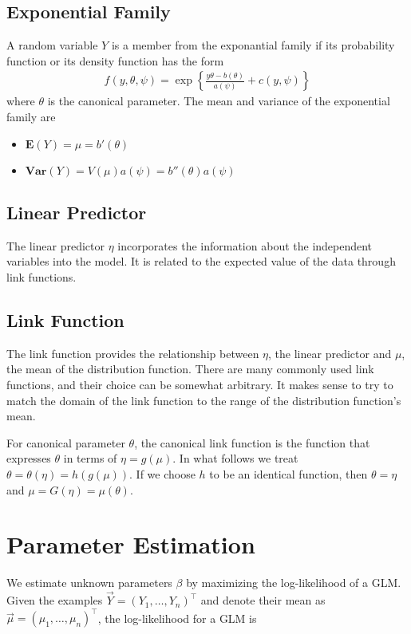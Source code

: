 \subsection{Exponential Family}
A random variable $Y$ is a member from the exponantial family if its probability function or its density function has the form
\begin{align*}
f(y,\theta, \psi) = \exp \left\{ \frac{y\theta - b(\theta)}{a(\psi)} + c(y, \psi)\right\}
\end{align*}
where $\theta$ is the canonical parameter.
The mean and variance of the exponential family are
\begin{itemize}
\item $\mathbf{E}(Y) = \mu = b'(\theta)$
\item $\mathbf{Var}(Y) = V(\mu)a(\psi) = b''(\theta)a(\psi)$
\end{itemize}

\subsection{Linear Predictor}
The linear predictor $\eta$ incorporates the information about the independent variables into the model. It is related to the expected value of the data through link functions.

\subsection{Link Function}
The link function provides the relationship between $\eta$, the linear predictor and $\mu$, the mean of the distribution function. There are many commonly used link functions, and their choice can be somewhat arbitrary. It makes sense to try to match the domain of the link function to the range of the distribution function's mean.

For canonical parameter $\theta$, the canonical link function is the function that expresses $\theta$ in terms of $\eta = g(\mu)$. In what follows we treat $\theta = \theta(\eta) = h(g(\mu))$. If we choose $h$ to be an identical function, then $\theta = \eta$
and $\mu = G(\eta) = \mu(\theta)$.

\section{Parameter Estimation}
We estimate unknown parameters $\beta$ by maximizing the log-likelihood of a GLM. Given the examples $\vec{Y} = (Y_1, \dots, Y_n)^\top$ and denote their mean as $\vec{\mu} = (\mu_1, \dots, \mu_{n})^\top$, the log-likelihood for a GLM is

